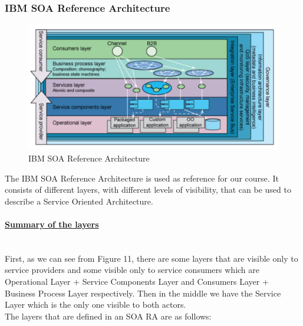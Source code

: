 \documentclass[10pt,a4paper]{article}
\newcommand{\myparagraph}[1]{\paragraph{\uline{#1}}\mbox{}\\[0.05in]}
\begin{document}
\subsubsection{IBM SOA Reference Architecture}
\begin{figure}[h!]
 \hfill \includegraphics[width=\linewidth]{images/ibm-soa}\hspace*{\fill}
  \caption{IBM SOA Reference Architecture}
  \label{fig:imb-soa}
\end{figure}
The IBM SOA Reference Architecture is used as reference for our course. It consists of different layers, with different levels of visibility, that can be used to describe a Service Oriented Architecture.
\myparagraph{Summary of the layers}
First, as we can see from Figure 11, there are some layers that are visible only to service providers and some visible only to service consumers which are Operational Layer + Service Components Layer and Consumers Layer + Business Process Layer respectively. Then in the middle we have the Service Layer which is the only one visible to both actors. \\
The layers that are defined in an SOA RA are as follows:
\end{document}
